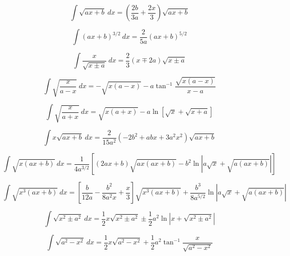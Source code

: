 \documentclass[12pt,a4paper,leqno]{article}
\begin{document}
    \begin{equation}
    \int \sqrt{ax+b}\ dx = \left(\frac{2b}{3a}+\frac{2x}{3}\right)\sqrt{ax+b}
    \end{equation}

    \begin{equation}
    \int (ax+b)^{3/2}\ dx =\frac{2}{5a}(ax+b)^{5/2}
    \end{equation}

    \begin{equation}\label{eq:Weems}
    \int \frac{x}{\sqrt{x\pm a} } \ dx = \frac{2}{3}(x\mp 2a)\sqrt{x\pm a}
    \end{equation}

    \begin{equation}
    \int \sqrt{\frac{x}{a-x}}\ dx =  -\sqrt{x(a-x)}
    -a\tan^{-1}\frac{\sqrt{x(a-x)}}{x-a}
    \end{equation}

    \begin{equation}
    \int \sqrt{\frac{x}{a+x}}\ dx =  \sqrt{x(a+x)}
    -a\ln \left [ \sqrt{x} + \sqrt{x+a}\right]
    \end{equation}

    \begin{equation}
    \int x \sqrt{ax + b}\ dx =
    \frac{2}{15 a^2}(-2b^2+abx + 3 a^2 x^2)
    \sqrt{ax+b}
    \end{equation}

    \begin{equation}
    \int \sqrt{x(ax+b)}\ dx = \frac{1}{4a^{3/2}}\left[(2ax + b)\sqrt{ax(ax+b)}
    -b^2 \ln \left| a\sqrt{x} + \sqrt{a(ax+b)} \right| \right ]
    \end{equation}

    \begin{equation}
    \int \sqrt{x^3(ax+b)} \ dx =\left [
    \frac{b}{12a}-
    \frac{b^2}{8a^2x}+
    \frac{x}{3}\right]
    \sqrt{x^3(ax+b)}  +
    \frac{b^3}{8a^{5/2}}\ln \left | a\sqrt{x} + \sqrt{a(ax+b)} \right |
    \end{equation}

    \begin{equation}
    \int\sqrt{x^2 \pm a^2}\ dx = \frac{1}{2}x\sqrt{x^2\pm a^2}
    \pm\frac{1}{2}a^2 \ln \left | x + \sqrt{x^2\pm a^2} \right |
    \end{equation}



   \begin{equation}
   \int  \sqrt{a^2 - x^2}\ dx = \frac{1}{2} x \sqrt{a^2-x^2}
   +\frac{1}{2}a^2\tan^{-1}\frac{x}{\sqrt{a^2-x^2}}
   \end{equation}
\end{document}
